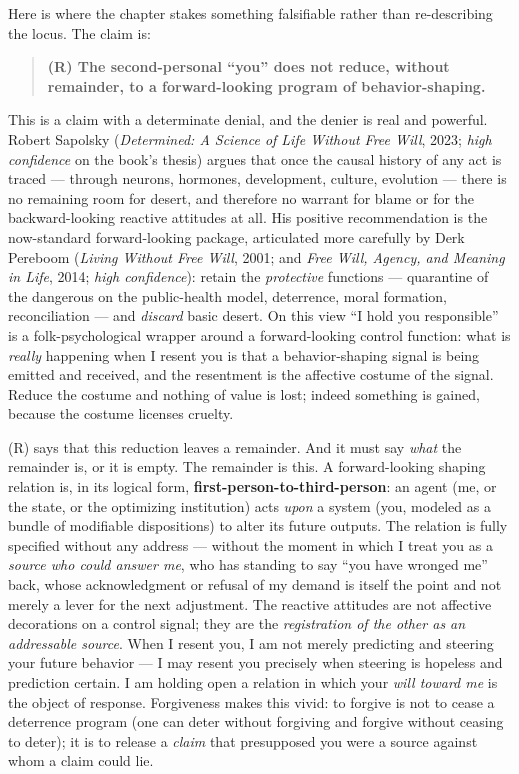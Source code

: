 \documentclass[11pt]{article}
\begin{document}
Here is where the chapter stakes something falsifiable rather than re-describing the locus. The claim is:

\begin{quote}
\textbf{(R) The second-personal ``you'' does not reduce, without remainder, to a forward-looking program of behavior-shaping.}
\end{quote}

This is a claim with a determinate denial, and the denier is real and powerful. Robert Sapolsky (\emph{Determined: A Science of Life Without Free Will}, 2023; \emph{high confidence} on the book's thesis) argues that once the causal history of any act is traced — through neurons, hormones, development, culture, evolution — there is no remaining room for desert, and therefore no warrant for blame or for the backward-looking reactive attitudes at all. His positive recommendation is the now-standard forward-looking package, articulated more carefully by Derk Pereboom (\emph{Living Without Free Will}, 2001; and \emph{Free Will, Agency, and Meaning in Life}, 2014; \emph{high confidence}): retain the \emph{protective} functions — quarantine of the dangerous on the public-health model, deterrence, moral formation, reconciliation — and \emph{discard} basic desert. On this view ``I hold you responsible'' is a folk-psychological wrapper around a forward-looking control function: what is \emph{really} happening when I resent you is that a behavior-shaping signal is being emitted and received, and the resentment is the affective costume of the signal. Reduce the costume and nothing of value is lost; indeed something is gained, because the costume licenses cruelty.

(R) says that this reduction leaves a remainder. And it must say \emph{what} the remainder is, or it is empty. The remainder is this. A forward-looking shaping relation is, in its logical form, \textbf{first-person-to-third-person}: an agent (me, or the state, or the optimizing institution) acts \emph{upon} a system (you, modeled as a bundle of modifiable dispositions) to alter its future outputs. The relation is fully specified without any address — without the moment in which I treat you as a \emph{source who could answer me}, who has standing to say ``you have wronged me'' back, whose acknowledgment or refusal of my demand is itself the point and not merely a lever for the next adjustment. The reactive attitudes are not affective decorations on a control signal; they are the \emph{registration of the other as an addressable source}. When I resent you, I am not merely predicting and steering your future behavior — I may resent you precisely when steering is hopeless and prediction certain. I am holding open a relation in which your \emph{will toward me} is the object of response. Forgiveness makes this vivid: to forgive is not to cease a deterrence program (one can deter without forgiving and forgive without ceasing to deter); it is to release a \emph{claim} that presupposed you were a source against whom a claim could lie.
\end{document}
